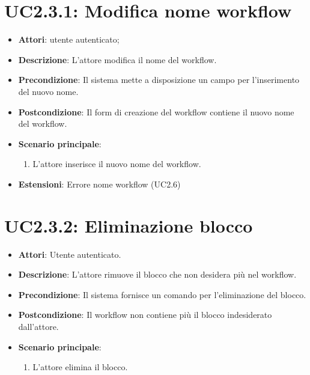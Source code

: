 \section{UC2.3.1: Modifica nome workflow}
\label{UC2.3.1}
\begin{itemize}
	\item \textbf{Attori}: utente autenticato;
	\item \textbf{Descrizione}: L'attore modifica il nome del workflow.
	\item \textbf{Precondizione}: Il sistema mette a disposizione un campo per l'inserimento del nuovo nome.
	\item \textbf{Postcondizione}: Il form di creazione del workflow contiene il nuovo nome del workflow.
	\item \textbf{Scenario principale}:
	\begin{enumerate} \item L'attore inserisce il nuovo nome del workflow.\end{enumerate}
	\item \textbf{Estensioni}:
	Errore nome workflow (UC2.6)
\end{itemize}

\section{UC2.3.2: Eliminazione blocco}
\label{UC2.3.2}
\begin{itemize}
	\item \textbf{Attori}: Utente autenticato.
	\item \textbf{Descrizione}: L'attore rimuove il blocco che non desidera più nel workflow.
	\item \textbf{Precondizione}: Il sistema fornisce un comando per l'eliminazione del blocco.
	\item \textbf{Postcondizione}: Il workflow non contiene più il blocco indesiderato dall'attore.
	\item \textbf{Scenario principale}:
	\begin{enumerate} \item L'attore elimina il blocco.\end{enumerate}
\end{itemize}

